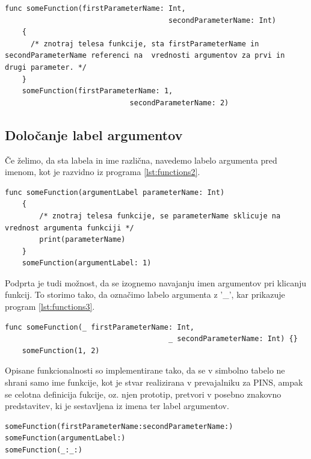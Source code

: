 \documentclass[a4paper, 12p]{book}
\begin{document}
\begin{lstlisting}[caption={Primer definicije in klica funkcije.}, captionpos=b, label={lst:functions1}]
	func someFunction(firstParameterName: Int, 
									  secondParameterName: Int) 
	{
	  /* znotraj telesa funkcije, sta firstParameterName in secondParameterName referenci na  vrednosti argumentov za prvi in drugi parameter. */
	}
	someFunction(firstParameterName: 1, 
							 secondParameterName: 2)
\end{lstlisting}

\subsection{Določanje label argumentov}

Če želimo, da sta labela in ime različna, navedemo labelo argumenta pred imenom, kot je razvidno iz programa \ref{lst:functions2}.

\begin{lstlisting}[caption={Labela argumenta in ime parametra se razlikujeta.}, captionpos=b, label={lst:functions2}]
	func someFunction(argumentLabel parameterName: Int) 
	{
		/* znotraj telesa funkcije, se parameterName sklicuje na vrednost argumenta funkciji */
		print(parameterName)
	}
	someFunction(argumentLabel: 1)
\end{lstlisting}

Podprta je tudi možnost, da se izognemo navajanju imen argumentov pri klicanju funkcij. To storimo tako, da označimo labelo argumenta z '\_', kar prikazuje program \ref{lst:functions3}.

\begin{lstlisting}[caption={Klic funkcije brez navedbe imen argumentov.}, captionpos=b, label={lst:functions3}]
	func someFunction(_ firstParameterName: Int, 
									  _ secondParameterName: Int) {}
	someFunction(1, 2)
\end{lstlisting}

Opisane funkcionalnosti so implementirane tako, da se v simbolno tabelo ne shrani samo ime funkcije, kot je stvar realizirana v prevajalniku za PINS, ampak se celotna definicija fukcije, oz. njen prototip, pretvori v posebno znakovno predstavitev, ki je sestavljena iz imena ter label argumentov.

\renewcommand{\lstlistingname}{Izpis}
\begin{lstlisting}[caption={Znakovne predstavitve funkcij.}, captionpos=b, label={lst:functionStringRepr}]
someFunction(firstParameterName:secondParameterName:)
someFunction(argumentLabel:)
someFunction(_:_:)
\end{lstlisting}
\end{document}
